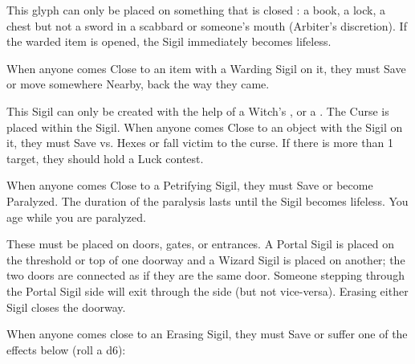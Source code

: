 {

This glyph can only be placed on something that is closed : a book, a lock, a chest but not a sword in a scabbard or someone's mouth (Arbiter's discretion).  If the warded item is opened, the Sigil immediately becomes lifeless.

When anyone comes Close to an item with a Warding Sigil on it, they must Save or move somewhere Nearby, back the way they came. 






This Sigil can only be created with the help of a Witch's , or a .  The Curse is placed within the Sigil.  When anyone comes Close to an object with the Sigil on it, they must Save vs. Hexes or fall victim to the curse.  If there is more than 1 target, they should hold a Luck contest. 


When anyone comes Close to a Petrifying Sigil, they must Save or become Paralyzed.  The duration of the paralysis lasts until the Sigil becomes lifeless. You age while you are paralyzed.


These must be placed on doors, gates, or entrances.  A Portal Sigil is placed on the threshold or top of one doorway and a Wizard Sigil is placed on another; the two doors are connected as if they are the same door.  Someone stepping through the Portal Sigil side will exit through the  side (but not vice-versa).  Erasing either Sigil closes the doorway.





When anyone comes close to an Erasing Sigil, they must Save or suffer one of the effects below (roll a d6):

}
